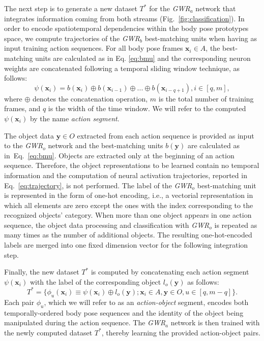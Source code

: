 \documentclass[5p,times]{elsarticle}
\begin{document}
The next step is to generate a new dataset $T^{*}$ for the \textit{GWR}$_a$ network that integrates information coming from both streams (Fig.~\ref{fig:classification}).
In order to encode spatiotemporal dependencies within the body pose prototypes space, we compute trajectories of the \textit{GWR}$_b$ best-matching units when having as input training action sequences.
For all body pose frames $\textbf{x}_i \in A$, the best-matching units are calculated as in Eq. \ref{eq:bmu} and the corresponding neuron weights are concatenated following a temporal sliding window technique, as follows: 
\begin{equation}\label{eq:trajectory}
\psi(\textbf{x}_i) = b(\textbf{x}_i) \oplus b(\textbf{x}_{i-1}) \oplus ... \oplus b(\textbf{x}_{i-q+1}), i \in [q,m],
\end{equation}
where $\oplus$ denotes the concatenation operation, $m$ is the total number of training frames, and $q$ is the width of the time window.
We will refer to the computed $\psi(\textbf{x}_i)$ by the name \textit{action segment}.

The object data $\textbf{y} \in O$ extracted from each action sequence is provided as input to the \textit{GWR}$_o$ network and the best-matching units $b(\textbf{y})$ are calculated as in~Eq.~\ref{eq:bmu}.
Objects are extracted only at the beginning of an action sequence. 
Therefore, the object representations to be learned contain no temporal information and the computation of neural activation trajectories, reported in Eq.~\ref{eq:trajectory}, is not performed. 
The label of the \textit{GWR}$_o$ best-matching unit is represented in the form of one-hot encoding, i.e., a vectorial representation in which all elements are zero except the ones with the index corresponding to the recognized objects' category.
When more than one object appears in one action sequence, the object data processing and classification with \textit{GWR}$_o$ is repeated as many times as the number of additional objects. The resulting one-hot-encoded labels are merged into one fixed dimension vector for the following integration step.

Finally, the new dataset $T^{*}$ is computed by concatenating each action segment $\psi(\textbf{x}_i)$ with the label of the corresponding object $l_o(\textbf{y})$ as follows:
\begin{equation}\label{eq:pair}
T^{*} = \{ \phi_u(\textbf{x}_i) \equiv \psi(\textbf{x}_i) \oplus l_o(\textbf{y}); \textbf{x}_i \in A, \textbf{y} \in O, u \in [q,m-q] \}.
\end{equation}
Each pair $\phi_u$, which we will refer to as an \textit{action-object} segment, encodes both temporally-ordered body pose sequences and the identity of the object being manipulated during the action sequence.
The \textit{GWR}$_a$ network is then trained with the newly computed dataset $T^{*}$, thereby learning the provided action-object pairs.
\end{document}
